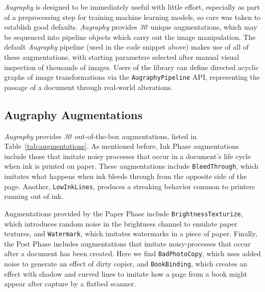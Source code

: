 \documentclass[runningheads]{llncs}
\newcommand{\numAugraphyAugmentations}{\emph{30}}
\begin{document}
\emph{Augraphy} is designed to be immediately useful with little effort, especially as part of a preprocessing step for training machine learning models, so care was taken to establish good defaults.
\emph{Augraphy} provides \numAugraphyAugmentations ~unique augmentations, which may be sequenced into pipeline objects which carry out the image manipulation. The default \emph{Augraphy} pipeline (used in the code snippet above) makes use of all of these augmentations, with starting parameters selected after manual visual inspection of thousands of images.
Users of the library can define directed acyclic graphs of image transformations via the \texttt{AugraphyPipeline} API, representing the passage of a document through real-world alterations.

\subsection{Augraphy Augmentations}

\emph{Augraphy} provides \numAugraphyAugmentations ~out-of-the-box augmentations, listed in Table~\ref{tab:augmentations}.
As mentioned before, Ink Phase augmentations include those that imitate noisy processes that occur in a document's life cycle when ink is printed on paper.
These augmentations include \texttt{BleedThrough}, which imitates what happens when ink bleeds through from the opposite side of the page.
Another, \texttt{LowInkLines}, produces a streaking behavior common to printers running out of ink.

Augmentations provided by the Paper Phase include \texttt{BrightnessTexturize}, which introduces random noise in the brightness channel to emulate paper textures, and \texttt{Watermark}, which imitates watermarks in a piece of paper.
Finally, the Post Phase includes augmentations that imitate noisy-processes that occur after a document has been created.
Here we find \texttt{BadPhotoCopy}, which uses added noise to generate an effect of dirty copier, and \texttt{BookBinding}, which creates an effect with shadow and curved lines to imitate how a page from a book might appear after capture by a flatbed scanner.
\end{document}
